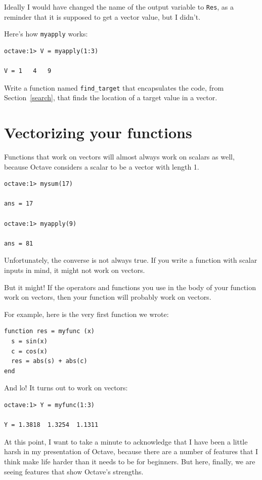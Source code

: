 \documentclass{book}
\begin{document}
Ideally I would have changed the name of the output variable to
{\tt Res}, as a reminder that it is supposed to get a vector value,
but I didn't.

Here's how {\tt myapply} works:

\begin{verbatim}
octave:1> V = myapply(1:3)

V = 1   4   9
\end{verbatim}

\begin{ex}
Write a function named {\tt find\_target} that
encapsulates the code, from Section~\ref{search}, that finds the
location of a target value in a vector.
\end{ex}


\section{Vectorizing your functions}

Functions that work on vectors will almost always work on scalars
as well, because Octave considers a scalar to be a vector with
length 1.

\begin{verbatim}
octave:1> mysum(17)

ans = 17

octave:1> myapply(9)

ans = 81
\end{verbatim}

Unfortunately, the converse is not always true. If you write
a function with scalar inputs in mind, it might not work on vectors.

But it might! If the operators and functions
you use in the body of your function work on vectors, then your
function will probably work on vectors.

For example, here is the very first function we wrote:

\begin{verbatim}
function res = myfunc (x)
  s = sin(x)
  c = cos(x)
  res = abs(s) + abs(c)
end
\end{verbatim}

And lo! It turns out to work on vectors:

\begin{verbatim}
octave:1> Y = myfunc(1:3)

Y = 1.3818  1.3254  1.1311
\end{verbatim}

At this point, I want to take a minute to acknowledge that I
have been a little harsh in my presentation of Octave, because
there are a number of features that I think make life harder
than it needs to be for beginners. But here, finally,
we are seeing features that show Octave's strengths.
\end{document}

